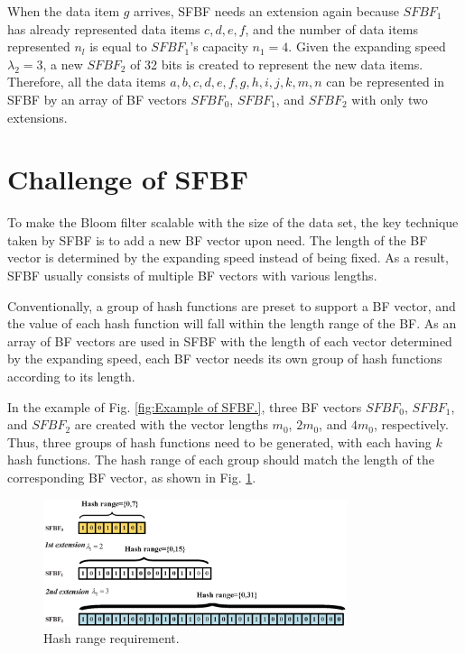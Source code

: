 \documentclass[10pt,journal,compsoc]{IEEEtran}
\begin{document}
When the data item $g$ arrives, SFBF needs an extension again because $SFBF_1$ has already represented data items $c, d, e, f$, and the number of data items represented $n_l$ is equal to $SFBF_1$'s capacity $n_1=4$.
Given the expanding speed ${\lambda _2} = 3$,  a new $SFBF_2$ of 32 bits is created to represent the new data items. Therefore, all the data items $a, b, c, d, e, f, g, h, i, j, k, m, n$ can be represented in SFBF by an array of BF vectors $SFBF_0$, $SFBF_1$, and $SFBF_2$ with only two extensions.

\section{Challenge of SFBF}
\label{sec:Challenge in SFBF}
To make the Bloom filter scalable with the size of the data set, the key technique taken by SFBF is to add a new BF vector upon need. The length of the BF vector is determined by the expanding speed instead of being fixed.
  As a result, SFBF usually consists of multiple BF vectors with various lengths. %


Conventionally, a group of hash functions are preset to support a BF vector, and the value of each hash function will fall within the length range of the BF. As an array of BF vectors are used in SFBF with the length of each vector determined by the expanding speed, each BF vector needs its own group of hash functions according to its length.

In the example of Fig. \ref{fig:Example of SFBF.}, three BF vectors $SFBF_0$, $SFBF_1$, and $SFBF_2$ are created with the vector lengths $m_0$, $2m_0$, and $4m_0$, respectively. Thus, three groups of hash functions need to be generated, with each having $k$ hash functions. The hash range of each group should match the length of the corresponding BF vector, as shown in Fig. \ref{fig:Hash range requirement.}.

\begin{figure}[!h]
\centering
\includegraphics[width=3.5in]{fig/HashRange}
\caption{Hash range requirement.}
\label{fig:Hash range requirement.}
\end{figure}
\end{document}
